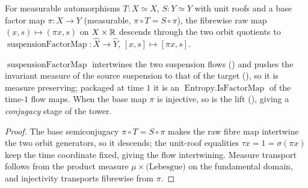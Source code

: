 \begin{definition}\label{suspensionFactorMap}
  \leanok
  For measurable automorphisms \(T : X\simeq X\), \(S : Y\simeq Y\) with unit roofs and a base factor
  map \(\pi : X\to Y\) (measurable, \(\pi\circ T = S\circ\pi\)), the fibrewise raw map
  \((x,s)\mapsto(\pi x, s)\) on \(X\times\mathbb{R}\) descends through the two orbit quotients to
  \(\operatorname{suspensionFactorMap} : \widehat X\to\widehat Y\), \([x,s]\mapsto[\pi x, s]\).
\end{definition}

\begin{theorem}\label{isFactorMap_suspensionFactorMap}
  \leanok
  \(\operatorname{suspensionFactorMap}\) intertwines the two suspension flows
  () and pushes the invariant measure of the source
  suspension to that of the target (),
  so it is measure preserving; packaged at time \(1\) it is an
  \(\operatorname{Entropy.IsFactorMap}\) of the time-\(1\) flow maps. When the base map \(\pi\) is
  injective, so is the lift (), giving a
  \emph{conjugacy} stage of the tower.
\end{theorem}
\begin{proof}\leanok
  The base semiconjugacy \(\pi\circ T = S\circ\pi\) makes the raw fibre map intertwine the two orbit
  generators, so it descends; the unit-roof equalities \(\tau x = 1 = \sigma(\pi x)\) keep the time
  coordinate fixed, giving the flow intertwining. Measure transport follows from the product measure
  \(\mu\times\text{(Lebesgue)}\) on the fundamental domain, and injectivity transports fibrewise from
  \(\pi\).
\end{proof}
